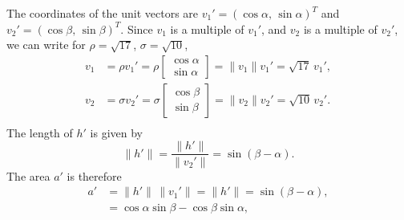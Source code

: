 \documentclass[10pt]{article}
\begin{document}
The coordinates of the unit vectors
are $v_1'=(\cos\alpha,\,\sin\alpha)^T$ and $v_2'=(\cos\beta,\,
\sin\beta)^T$.  Since $v_1$ is a multiple of $v_1'$, and $v_2$ is a
multiple of $v_2'$, we can write for $\rho=\sqrt{17}$, $\sigma=\sqrt{10}$,
\begin{align*}
v_1 &= \rho v_1' = \rho \left[\begin{array}{c}\cos\alpha\\\sin\alpha\end{array}\right] = \| v_1\| v_1' = \sqrt{17}\, v_1',\\
v_2 &= \sigma v_2' = \sigma \left[\begin{array}{c}\cos\beta\\\sin\beta\end{array}\right] = \| v_2\| v_2' = \sqrt{10}\, v_2'.\\
\end{align*}
The length of $h'$ is given by
\[
\| h'\| = \frac{\| h'\|}{\| v_2'\|} = \sin(\beta-\alpha).
\]
The area $a'$ is therefore
\begin{align*}
a' &= \| h'\|\, \|v_1'\| = \| h'\| = \sin(\beta-\alpha),\\
 &= \cos\alpha \sin\beta - \cos\beta\sin\alpha,
\end{align*}
\end{document}
